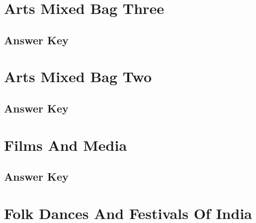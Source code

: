\documentclass[12pt,a4paper]{book}
\newcounter{totalcounter}
\begin{document}


\setcounter{totalcounter}{1}

\section{Arts Mixed Bag Three}



\subsection*{Answer Key}



\setcounter{totalcounter}{1}

\section{Arts Mixed Bag Two}



\subsection*{Answer Key}



\setcounter{totalcounter}{1}

\section{Films And Media}



\subsection*{Answer Key}



\setcounter{totalcounter}{1}

\section{Folk Dances And Festivals Of India}


\end{document}
